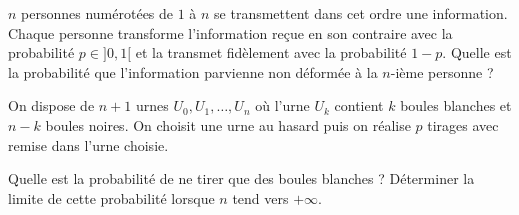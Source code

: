\documentclass{magnolia}
\begin{document}

$n$ personnes numérotées de $1$ à $n$ se transmettent dans cet ordre une
information. Chaque personne transforme l'information reçue en son contraire
avec la probabilité $p \in ]0,1[$ et la transmet fidèlement avec la probabilité
$1-p$. Quelle est la probabilité que l'information parvienne non déformée à la $n$-ième
personne ?


On dispose de $n+1$ urnes $U_0, U_1, \dots, U_n$ où l'urne $U_k$
contient $k$ boules blanches et $n-k$ boules noires. On choisit une
urne au hasard puis on réalise $p$ tirages avec remise dans l'urne
choisie.
\begin{questions}
\question Quelle est la probabilité de ne tirer que des boules blanches ?
\question Déterminer la limite de cette probabilité lorsque $n$ tend vers $+\infty$.
\end{questions}
\end{document}
